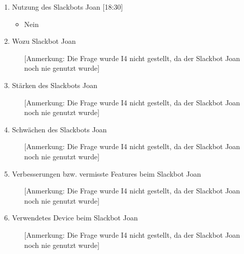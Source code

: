 \begin{enumerate}
    \item Nutzung des Slackbots Joan [18:30]
    \begin{itemize}
        \item Nein
    \end{itemize}
    
    \item Wozu Slackbot Joan
    \begin{itemize}
        \item[] [Anmerkung: Die Frage wurde I4 nicht gestellt, da der Slackbot Joan noch nie genutzt wurde] 
    \end{itemize}
    
    \item Stärken des Slackbots Joan
    \begin{itemize}
        \item[] [Anmerkung: Die Frage wurde I4 nicht gestellt, da der Slackbot Joan noch nie genutzt wurde]  
    \end{itemize}
    
    \item Schwächen des Slackbots Joan
    \begin{itemize}
        \item[] [Anmerkung: Die Frage wurde I4 nicht gestellt, da der Slackbot Joan noch nie genutzt wurde]  
    \end{itemize}
    
    \item Verbesserungen bzw. vermisste Features beim Slackbot Joan
    \begin{itemize}
        \item[] [Anmerkung: Die Frage wurde I4 nicht gestellt, da der Slackbot Joan noch nie genutzt wurde]  
    \end{itemize}
    
    \item Verwendetes Device beim Slackbot Joan
    \begin{itemize}
        \item[] [Anmerkung: Die Frage wurde I4 nicht gestellt, da der Slackbot Joan noch nie genutzt wurde]  
    \end{itemize}
    

\end{enumerate}

